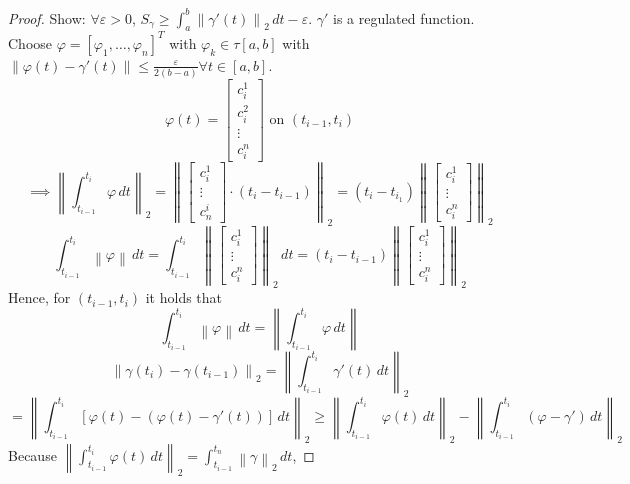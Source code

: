 \documentclass{article}
\newcommand{\norm}[1]{\left\|#1\right\|}
\begin{document}
\begin{proof}
  Show: $\forall \varepsilon > 0$, $S_\gamma \geq \int_a^b \norm{\gamma'(t)}_2 \, dt - \varepsilon$. $\gamma'$ is a regulated function. Choose $\varphi = [\varphi_1, \dots, \varphi_n]^T$ with $\varphi_k \in \tau[a,b]$ with $\norm{\varphi(t) - \gamma'(t)} \leq \frac{\varepsilon}{2(b - a)} \forall t \in [a,b]$.
  \[ \varphi(t) = \begin{bmatrix} c_i^1 \\ c_i^2 \\ \vdots \\ c_i^n \end{bmatrix} \text{ on } (t_{i-1}, t_i) \]
  \[ \implies \norm{\int_{t_{i-1}}^{t_i} \varphi \, dt}_2 = \norm{\begin{bmatrix} c_i^1 \\ \vdots \\ c_n^i \end{bmatrix} \cdot (t_i - t_{i-1})}_2 = (t_i - t_{i_1}) \norm{\begin{bmatrix} c_i^1 \\ \vdots \\ c_i^n \end{bmatrix}}_2 \]
  \[ \int_{t_{i-1}}^{t_i} \norm{\varphi} \, dt = \int_{t_{i-1}}^{t_i} \norm{\begin{bmatrix} c_i^1 \\ \vdots \\ c_i^n \end{bmatrix}}_2 \, dt = (t_i - t_{i-1}) \norm{\begin{bmatrix} c_i^1 \\ \vdots \\ c_i^n \end{bmatrix}}_2 \]
  Hence, for $(t_{i-1}, t_i)$ it holds that
  \[ \int_{t_{i-1}}^{t_i} \norm{\varphi} \, dt = \norm{\int_{t_{i-1}}^{t_i} \varphi \, dt} \]
  \[ \norm{\gamma(t_i) - \gamma(t_{i-1})}_2 = \norm{\int_{t_{i-1}}^{t_i} \gamma'(t) \, dt}_2 \]
  \[ = \norm{\int_{t_{i-1}}^{t_i} \left[\varphi(t) - (\varphi(t) - \gamma'(t))\right] \, dt}_2
       \geq \norm{\int_{t_{i-1}}^{t_i} \varphi(t) \, dt}_2 - \norm{\int_{t_{i-1}}^{t_i} (\varphi - \gamma') \, dt}_2 \]
  Because $\norm{\int_{t_{i-1}}^{t_i} \varphi(t) \, dt}_2 = \int_{t_{i-1}}^{t_n} \norm{\gamma}_2 \, dt$,

\end{proof}
\end{document}
